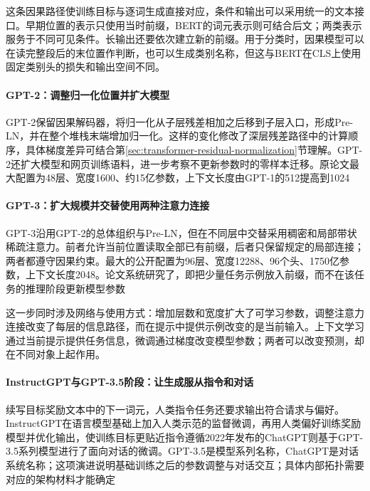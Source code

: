 这条因果路径使训练目标与逐词生成直接对应，条件和输出可以采用统一的文本接口。早期位置的表示只使用当时前缀，BERT的词元表示则可结合后文；两类表示服务于不同可见条件。长输出还要依次建立新的前缀。用于分类时，因果模型可以在读完整段后的末位置作判断，也可以生成类别名称，但这与BERT在CLS上使用固定类别头的损失和输出空间不同。

\paragraph{GPT-2：调整归一化位置并扩大模型}

GPT-2保留因果解码器，将归一化从子层残差相加之后移到子层入口，形成Pre-LN，并在整个堆栈末端增加归一化。这样的变化修改了深层残差路径中的计算顺序，具体梯度差异可结合第\ref{sec:transformer-residual-normalization}节理解。GPT-2还扩大模型和网页训练语料，进一步考察不更新参数时的零样本迁移。原论文最大配置为48层、宽度1600、约15亿参数，上下文长度由GPT-1的512提高到1024

\Needspace{190mm}
\paragraph{GPT-3：扩大规模并交替使用两种注意力连接}

GPT-3沿用GPT-2的总体组织与Pre-LN，但在不同层中交替采用稠密和局部带状稀疏注意力。前者允许当前位置读取全部已有前缀，后者只保留规定的局部连接；两者都遵守因果约束。最大的公开配置为96层、宽度12288、96个头、1750亿参数，上下文长度2048。论文系统研究了，即把少量任务示例放入前缀，而不在该任务的推理阶段更新模型参数

这一步同时涉及网络与使用方式：增加层数和宽度扩大了可学习参数，调整注意力连接改变了每层的信息路径，而在提示中提供示例改变的是当前输入。上下文学习通过当前提示提供任务信息，微调通过梯度改变模型参数；两者可以改变预测，却在不同对象上起作用。

\Needspace{165mm}
\paragraph{InstructGPT与GPT-3.5阶段：让生成服从指令和对话}

续写目标奖励文本中的下一词元，人类指令任务还要求输出符合请求与偏好。InstructGPT在语言模型基础上加入人类示范的监督微调，再用人类偏好训练奖励模型并优化输出，使训练目标更贴近指令遵循2022年发布的ChatGPT则基于GPT-3.5系列模型进行了面向对话的微调。GPT-3.5是模型系列名称，ChatGPT是对话系统名称；这项演进说明基础训练之后的参数调整与对话交互；具体内部拓扑需要对应的架构材料才能确定

